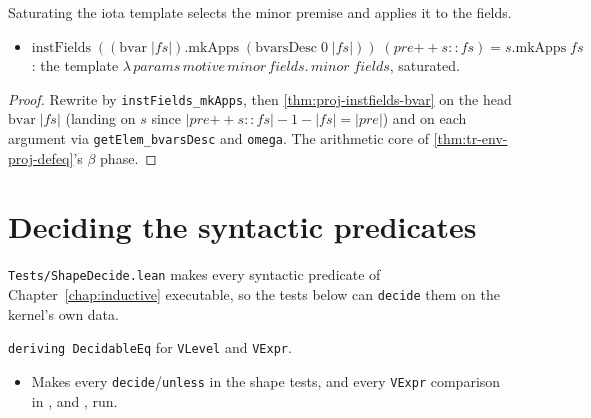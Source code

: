 \begin{theorem}
  \label{thm:proj-instfields-minor-spine}
  \leanok

   Saturating the iota template selects the minor premise and applies it to the
  fields.
  \begin{itemize}
  \item $\mathrm{instFields}\;((\mathrm{bvar}\;|fs|).\mathrm{mkApps}\;
        (\mathrm{bvarsDesc}\;0\;|fs|))\;(pre \mathbin{+\!\!+} s :: fs) = s.\mathrm{mkApps}\;fs$: the
        template $\lambda\,\mathit{params}\,\mathit{motive}\,\mathit{minor}\,\mathit{fields}.\,
        \mathit{minor}\;\mathit{fields}$, saturated.
  \end{itemize}
\end{theorem}
\begin{proof}
  \leanok
   Rewrite by \texttt{instFields\_mkApps}, then \ref{thm:proj-instfields-bvar} on the
  head $\mathrm{bvar}\;|fs|$ (landing on $s$ since $|pre \mathbin{+\!\!+} s::fs|-1-|fs|=|pre|$) and on
  each argument via \texttt{getElem\_bvarsDesc} and \texttt{omega}. The arithmetic core of
  \ref{thm:tr-env-proj-defeq}'s $\beta$ phase.
\end{proof}

\section{Deciding the syntactic predicates}

\texttt{Tests/ShapeDecide.lean} makes every syntactic predicate of Chapter~\ref{chap:inductive}
executable, so the tests below can \texttt{decide} them on the kernel's own data.

\begin{example}
  \label{fam:shapedecide-deceq}
  \leanok

   \texttt{deriving DecidableEq} for \texttt{VLevel} and \texttt{VExpr}.
  \begin{itemize}
  \item Makes every \texttt{decide}/\texttt{unless} in the shape tests, and every \texttt{VExpr}
        comparison in ,
         and ,
        run.
  \end{itemize}
\end{example}

